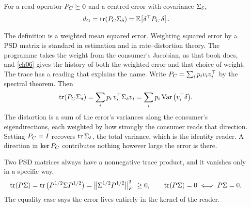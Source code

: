 \begin{definition}\label{def:ch01:dO}
For a read operator $P_C\succeq 0$ and a centred error with covariance $\Sigma_\delta$,
\begin{equation}\label{eq:ch01:dO}
d_O=\operatorname{tr}(P_C\Sigma_\delta)=\mathbb{E}\big[\delta^{\top}P_C\,\delta\big].
\end{equation}
\end{definition}

The definition is a weighted mean squared error. Weighting squared error by a
PSD matrix is standard in estimation and in rate--distortion theory. The
programme takes the weight from the consumer's Jacobian, as that book does, and
\cref{ch06} gives the history of both the weighted error and that choice of
weight. The trace has a reading that explains the name.
Write $P_C=\sum_i p_i v_iv_i^{\top}$ by the spectral theorem. Then
\begin{equation}\label{eq:ch01:weightedvar}
\operatorname{tr}(P_C\Sigma_\delta)=\sum_i p_i\,v_i^{\top}\Sigma_\delta v_i=\sum_i p_i\operatorname{Var}\big(v_i^{\top}\delta\big).
\end{equation}
The distortion is a sum of the error's variances along the consumer's
eigendirections, each weighted by how strongly the consumer reads that
direction. Setting $P_C=I$ recovers $\operatorname{tr}\Sigma_\delta$, the total variance, which is
the identity reader. A direction in $\operatorname{ker}P_C$ contributes nothing however
large the error is there.

Two PSD matrices always have a nonnegative trace product, and it vanishes
only in a specific way,
\begin{equation}\label{eq:ch01:tracepos}
\operatorname{tr}(P\Sigma)=\operatorname{tr}\big(P^{1/2}\Sigma P^{1/2}\big)=\big\|\Sigma^{1/2}P^{1/2}\big\|_F^2\ \ge 0,
\qquad \operatorname{tr}(P\Sigma)=0 \iff P\Sigma=0 .
\end{equation}
The equality case says the error lives entirely in the kernel of the reader.

